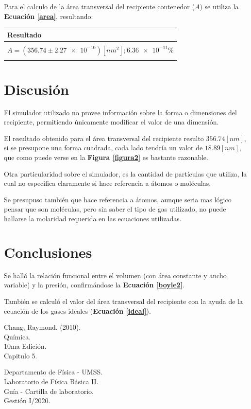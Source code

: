 \documentclass[letter,11pt]{article}
\begin{document}
Para el calculo de la área transversal del recipiente contenedor ($A$) se
utiliza la \textbf{Ecuación \ref{area}}, resultando:

\begin{center}
\begin{tabular}{|>{\centering}m{9.2cm}<{\centering}|}
\hline
\textbf{Resultado} 
\tabularnewline \hline
\\
$A = (356.74 \pm \num{2.27e-10}) [nm^2]; \num{6.36e-11}\%$ \tabularnewline
\\
\hline
\end{tabular}
\end{center}
\vspace{0.10cm}

\section{Discusión}

El simulador utilizado no provee información sobre la forma o dimensiones del
recipiente, permitiendo únicamente modificar el valor de una dimensión.

El resultado obtenido para el área transversal del recipiente resulto
$356.74 [nm]$, si se presupone una forma cuadrada, cada lado tendría un valor
de $18.89 [nm]$, que como puede verse en la \textbf{Figura \ref{figura2}} es
bastante razonable.

Otra particularidad sobre el simulador, es la cantidad de partículas que
utiliza, la cual no especifica claramente si hace referencia a átomos o
moléculas.

Se presupuso también que hace referencia a átomos, aunque seria mas lógico
pensar que son moléculas, pero sin saber el tipo de gas utilizado, no puede
hallarse la molaridad requerida en las ecuaciones utilizadas.

\section{Conclusiones}

Se halló la relación funcional entre el volumen (con área constante y ancho
variable) y la presión, confirmándose la \textbf{Ecuación \ref{boyle2}}.

También se calculó el valor del área transversal del recipiente con la ayuda
de la ecuación de los gases ideales (\textbf{Ecuación \ref{ideal}}).

\begin{thebibliography}{99}

 Chang, Raymond. (2010).\\
Química.\\
10ma Edición.\\
Capitulo 5.

 Departamento de Física - UMSS.\\
Laboratorio de Física Básica II.\\
Guía - Cartilla de laboratorio.\\
Gestión I/2020.

\end{thebibliography}
\end{document}
